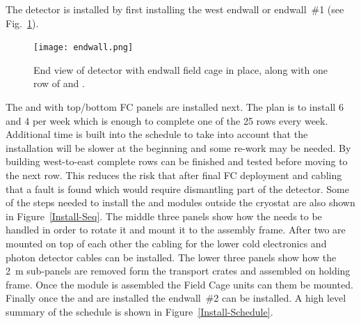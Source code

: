 The  detector is installed by first installing the west endwall or
endwall~\#1 (see Fig.~\ref{fig:endwall}).
\begin{figure}[htbp]
\begin{center}
\texttt{[image: endwall.png]}
\caption{End view of  detector with endwall field cage in
  place, along with one row of  and .}
\label{fig:endwall}
\end{center}
\end{figure}
The  and  with top/bottom FC panels are
installed next. The plan is to install \num{6}  and \num{4}
 per week which is enough to complete one of the \num{25}
rows every week. Additional time is built into the schedule to take
into account that the installation will be slower at the beginning and
some re-work may be needed. By building west-to-east complete rows can
be finished and tested before moving to the next row. This reduces the
risk that after final FC deployment and cabling that a fault is found
which would require dismantling part of the detector. Some of the steps
needed to install the  and  modules outside the
cryostat are also shown in Figure~\ref{Install-Seq}.  The middle three
panels show how the  needs to be handled in order to rotate
it and mount it to the assembly frame. After two  are
mounted on top of each other the cabling for the lower 
cold electronics and photon detector cables can be installed. The
lower three panels show how the \SI{2}{m}  sub-panels are
removed form the transport crates and assembled on holding frame. Once
the  module is assembled the Field Cage units can them be
mounted. Finally once the  and  are installed
the endwall~\#2 can be installed. A high level summary of the schedule
is shown in Figure~\ref{Install-Schedule}.
